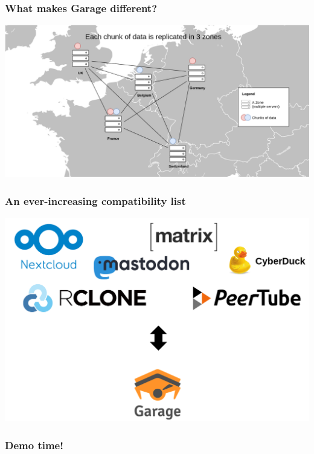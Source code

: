 \documentclass[aspectratio=169]{beamer}
\begin{document}
\begin{frame}
	\frametitle{What makes Garage different?}
		\begin{center}
			\includegraphics[width=.8\linewidth]{assets/map.png}
		\end{center}
\end{frame}

\begin{frame}
	\frametitle{An ever-increasing compatibility list}
		\begin{center}
			\includegraphics[width=.7\linewidth]{assets/compatibility.png}
		\end{center}
\end{frame}

\begin{frame}
	\frametitle{Demo time!}
\end{frame}
\end{document}
